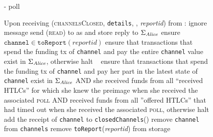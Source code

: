 \begin{figure}[H]
\begin{systembox}{\fpaynet - poll}
\begin{algorithmic}[1]
        \State {}
        \State Upon receiving (\textsc{channelsClosed}, \texttt{details},
        \alice, \textit{reportid}) from \simulator:
        \Indent
            \State ignore message
          \EndIf
          \State send (\textsc{read}) to \ledger{} as \alice{} and store reply
          to $\Sigma_{\mathit{Alice}}$
           \State ensure
          $\mathtt{channel} \in \mathtt{toReport}\left(\mathit{reportid}\right)$
              \State ensure that transactions that spend the funding tx of
              \texttt{channel} and pay \alice{} the entire \texttt{channel}
              value exist in $\Sigma_{\mathit{Alice}}$, otherwise halt
            \Else \ 
              \State ensure that transactions that spend the funding tx of
              \texttt{channel} and pay \alice{} her part in the latest state of
              \texttt{channel} exist in $\Sigma_{\mathit{Alice}}$ AND she received funds
              from all ``received HTLCs'' for which she knew the preimage when
              she received the associated \textsc{poll} AND received funds from
              all ''offered HTLCs'' that had timed out when she received the
              associated \textsc{poll}, otherwise halt
            \EndIf
            \State add the receipt of \texttt{channel} to
            \texttt{closedChannels}(\alice)
            \State remove \texttt{channel} from \texttt{channels}
          \EndFor
          \State remove \texttt{toReport}(\textit{reportid}) from storage
        \EndIndent
      \end{algorithmic}
    \end{systembox}
    \caption{}
    \label{alg:fpaynet:poll}
  \end{figure}


